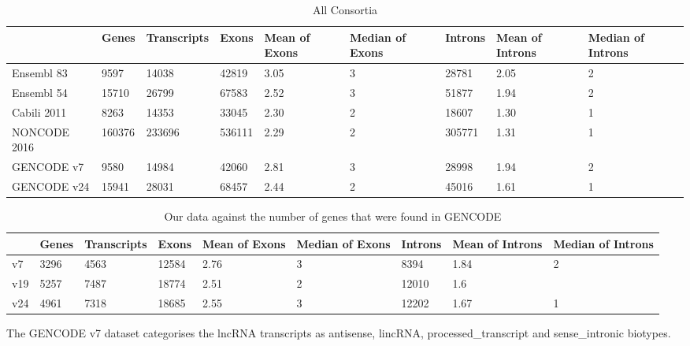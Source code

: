 \documentclass[ncrna,article,submit,moreauthors,pdftex,10pt,a4paper]{mdpi}
\begin{document}
\begin{table}[ht]
\caption{All Consortia} 
\centering
{\tiny
\begin{tabular}[lrrrrrrrr]{p{}|p{}p{}p{}p{}
p{}p{}p{}p{}}
  \hline
 & Genes & Transcripts & Exons & Mean of Exons & Median of Exons & Introns & Mean of Introns & Median of Introns \\ 
   \hline
Ensembl 83 & 9597 & 14038 & 42819 & 3.05 &   3 & 28781 & 2.05 &   2 \\ 
  Ensembl 54 & 15710 & 26799 & 67583 & 2.52 &   3 & 51877 & 1.94 &   2 \\ 
  Cabili 2011 & 8263 & 14353 & 33045 & 2.30 &   2 & 18607 & 1.30 &   1 \\ 
  NONCODE 2016 & 160376 & 233696 & 536111 & 2.29 &   2 & 305771 & 1.31 &   1 \\ 
  GENCODE v7 & 9580 & 14984 & 42060 & 2.81 &   3 & 28998 & 1.94 &   2 \\ 
  GENCODE v24 & 15941 & 28031 & 68457 & 2.44 &   2 & 45016 & 1.61 &   1 \\ 
   \hline
\end{tabular}
}
\end{table}%


\begin{table}[ht]
\centering
{\tiny
\begin{tabular}[lrrrrrrrr]{p{}|p{}p{}p{}p{}
p{}p{}p{}p{}}
  \hline
 & Genes & Transcripts & Exons & Mean of Exons & Median of Exons & Introns & Mean of Introns & Median of Introns \\ 
   \hline
v7 & 3296 & 4563 & 12584 & 2.76 & 3 & 8394 & 1.84 & 2\\
  v19 & 5257 & 7487 & 18774 & 2.51 & 2 & 12010 & 1.6\\
  v24 & 4961 & 7318 & 18685 & 2.55 & 3 & 12202 & 1.67 & 1\\ 
   \hline
\end{tabular}
}
\caption{Our data against the number of genes that were found in GENCODE} 
\end{table}%
\newpage


The GENCODE v7 dataset categorises the lncRNA transcripts as antisense, lincRNA, processed\_transcript and sense\_intronic biotypes. 
\end{document}
